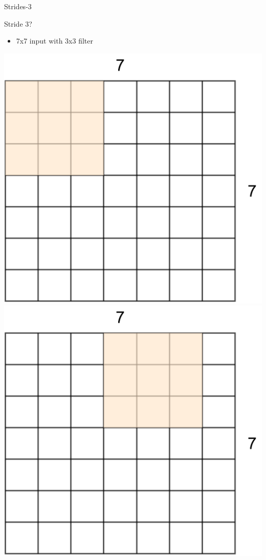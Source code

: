\documentclass[default, aspectratio=169]{beamer}
\begin{document}
	
	\begin{frame}{Strides-3}
		\vspace{0.5cm}
		
		\normalsize \color{red}Stride 3?
		\begin{itemize}
			\item 7x7 input with 3x3 filter
		\end{itemize}
		
		\centering
		\includegraphics[keepaspectratio, scale=0.15]{pic/Stride9.png}
		\hspace{0.2cm}
		\includegraphics[keepaspectratio, scale=0.15]{pic/Stride10.png}

\end{frame}
\end{document}
